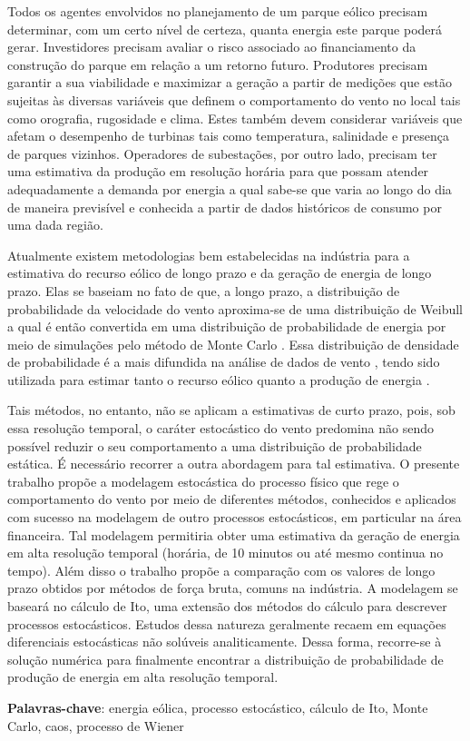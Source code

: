 \documentclass[
	12pt,				%
	openright,			%
	oneside,			%
	a4paper,			%
	english,			%
	french,				%
	spanish,			%
	brazil				%
	]{abntex2}
\begin{document}
\setlength{\absparsep}{18pt} %
\begin{resumo}
Todos os agentes envolvidos no planejamento de um parque eólico precisam determinar, com um certo nível de certeza, quanta energia este parque poderá gerar. Investidores precisam avaliar o risco associado ao financiamento da construção do parque em relação a um retorno futuro. Produtores precisam garantir a sua viabilidade e maximizar a geração a partir de medições que estão sujeitas às diversas variáveis que definem o comportamento do vento no local tais como orografia, rugosidade e clima. Estes também devem considerar variáveis que afetam o desempenho de turbinas tais como temperatura, salinidade e presença de parques vizinhos. Operadores de subestações, por outro lado, precisam ter uma estimativa da produção em resolução horária para que possam atender adequadamente a demanda por energia a qual sabe-se que varia ao longo do dia de maneira previsível e conhecida a partir de dados históricos de consumo por uma dada região.

Atualmente existem metodologias bem estabelecidas na indústria para a estimativa do recurso eólico de longo prazo e da geração de energia de longo prazo. Elas se baseiam no fato de que, a longo prazo, a distribuição de probabilidade da velocidade do vento aproxima-se de uma distribuição de Weibull \cite{weibull} a qual é então convertida em uma distribuição de probabilidade de energia por meio de simulações pelo método de Monte Carlo \cite{portacopos}. Essa distribuição de densidade de probabilidade é a mais difundida na análise de dados de vento \cite{art13},  tendo sido utilizada para estimar tanto o recurso eólico \cite{art14} quanto a produção de energia \cite{art15}.

Tais métodos, no entanto, não se aplicam a estimativas de curto prazo, pois, sob essa resolução temporal, o caráter estocástico do vento predomina não sendo possível reduzir o seu comportamento a uma distribuição de probabilidade estática. É necessário recorrer a outra abordagem para tal estimativa. O presente trabalho propõe a modelagem estocástica do processo físico que rege o comportamento do vento por meio de diferentes métodos, conhecidos e aplicados com sucesso na modelagem de outro processos estocásticos, em particular na área financeira. Tal modelagem permitiria obter uma estimativa da geração de energia em alta resolução temporal (horária, de 10 minutos ou até mesmo continua no tempo). Além disso o trabalho propõe a comparação com os valores de longo prazo obtidos por métodos de força bruta, comuns na indústria. A modelagem se baseará no cálculo de Ito, uma extensão dos métodos do cálculo para descrever processos estocásticos. Estudos dessa natureza geralmente recaem em equações diferenciais estocásticas não solúveis analiticamente. Dessa forma, recorre-se à solução numérica para finalmente encontrar a distribuição de probabilidade de produção de energia em alta resolução temporal.

 \textbf{Palavras-chave}: energia eólica, processo estocástico, cálculo de Ito, Monte Carlo, caos, processo de Wiener
\end{resumo}
\end{document}
